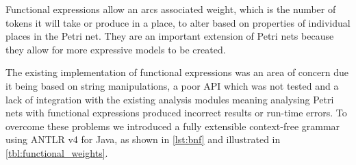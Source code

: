 Functional expressions allow an arcs associated weight, which is the number of tokens it will take or produce in a place, to alter based on properties of individual places in the Petri net. They are an important extension of Petri nets because they allow for more expressive models to be created.


The existing implementation of functional expressions was an area of concern due it being based on string manipulations, a poor API which was not tested and a lack of integration with the existing analysis modules meaning analysing Petri nets with functional expressions produced incorrect results or run-time errors. To overcome these problems we introduced a fully extensible context-free grammar using ANTLR v4 for Java, as shown in \cref{lst:bnf} and illustrated in \cref{tbl:functional_weights}.

